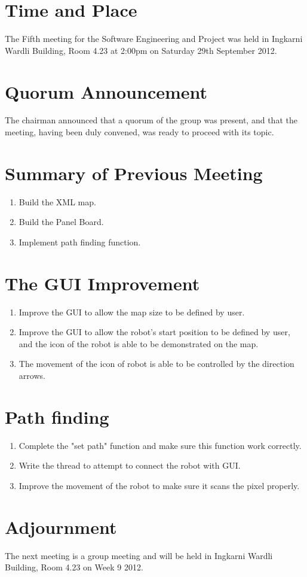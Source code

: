 \documentclass[11pt, a4paper]{article}
\begin{document}
\section{Time and Place}
The Fifth meeting for the Software Engineering and Project was held in Ingkarni Wardli Building, Room 4.23 at 2:00pm on Saturday 29th September 2012.


\section{Quorum Announcement}
The chairman announced that a quorum of the group was present, and that the meeting, having been duly convened, was ready to proceed with its topic.

\section{Summary of Previous Meeting}
\begin{enumerate}
\item Build the XML map.
\item Build the Panel Board.
\item Implement path finding function.
\end{enumerate}
 

\section{The GUI Improvement}
\begin{enumerate}
\item Improve the GUI  to allow the map size to be defined by user. 
\item Improve the GUI to allow the robot's start position to be defined by user, and the icon of the robot is able to be demonstrated on the map. 
\item The movement of the icon of robot is able to be controlled by the direction arrows.
\end{enumerate}

\section{Path finding}

\begin{enumerate}
\item Complete the "set path" function and make sure this function work correctly.
\item Write the thread to attempt to connect the robot with GUI.
\item Improve the movement of the robot to make sure it scans the pixel properly.

\end{enumerate}    

\section{Adjournment}
The next meeting is a group meeting and will be held in Ingkarni Wardli Building, Room 4.23 on Week 9 2012.

\vspace*{10pt}
\end{document}
